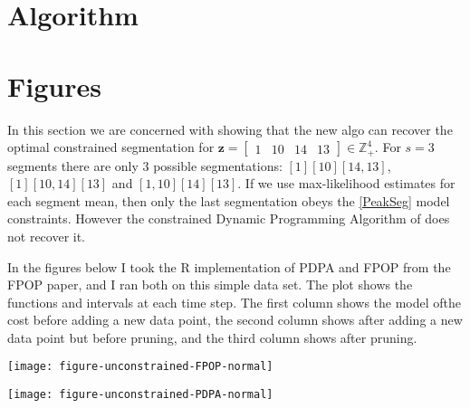 \documentclass{article}
\newcommand{\ZZ}{\mathbb Z}
\begin{document}
\section{Algorithm}

\section{Figures}

In this section we are concerned with showing that the new algo can
recover the optimal constrained segmentation for
$\mathbf z = \left[\begin{array}{cccc} 1 & 10 & 14 & 13
\end{array}\right]\in\ZZ_+^4
$. For $s=3$ segments there are only 3 possible segmentations:
$[1][10][14, 13]$, $[1][10, 14][13]$ and $[1, 10][14][13]$. If we use
max-likelihood estimates for each segment mean, then only the last
segmentation obeys the \ref{PeakSeg} model constraints. However the
constrained Dynamic Programming Algorithm of \citet{PeakSeg} does not
recover it.

In the figures below I took the R implementation of PDPA and FPOP from
the FPOP paper, and I ran both on this simple data set. The plot shows
the functions and intervals at each time step. The first column shows
the model ofthe cost before adding a new data point, the second column
shows after adding a new data point but before pruning, and the third
column shows after pruning.

\texttt{[image: figure-unconstrained-FPOP-normal]}

\texttt{[image: figure-unconstrained-PDPA-normal]}



\end{document}
